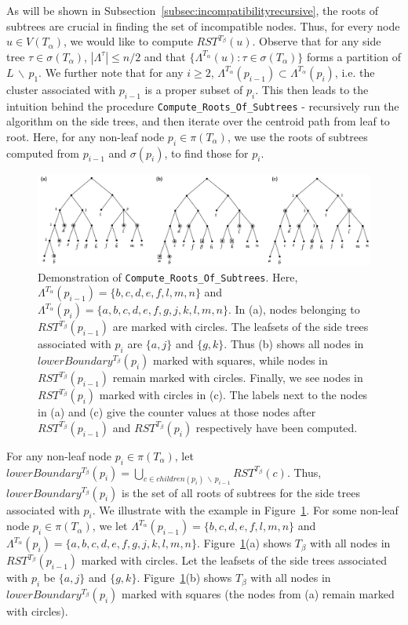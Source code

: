 \documentclass{article}
\newcommand{\leafset}{\Lambda}
\newcommand{\TA}{T_\alpha}
\newcommand{\TB}{T_\beta}
\begin{document}
    As will be shown in Subsection~\ref{subsec:incompatibilityrecursive}, the roots of subtrees are crucial in finding the set of incompatible nodes. Thus, for every node $u \in V(\TA)$, we would like to compute $RST^{\TB}(u)$. Observe that for any side tree $\tau \in \sigma(\TA)$, $|\leafset^\tau| \leq n/2$ and that $\{\leafset^{\TA}(u) : \tau \in \sigma(\TA)\}$ forms a partition of $L\, \backslash\, {p_1}$. We further note that for any $i \geq 2$, $\leafset^{\TA}(p_{i - 1}) \subset \leafset^{\TA}(p_i)$, i.e. the cluster associated with $p_{i-1}$ is a proper subset of $p_i$. This then leads to the intuition behind the procedure \texttt{Compute\_Roots\_Of\_Subtrees} - recursively run the algorithm on the side trees, and then iterate over the centroid path from leaf to root. Here, for any non-leaf node $p_i \in \pi(\TA)$, we use the roots of subtrees computed from $p_{i-1}$ and $\sigma(p_i)$, to find those for $p_i$.

    \begin{figure}[h]
        \includegraphics[scale=0.4]{rootsofsubtreesrecursive}
        \centering
        \caption{Demonstration of \texttt{Compute\_Roots\_Of\_Subtrees}. Here, $\leafset^{\TA}(p_{i-1}) = \{b, c, d, e, f, l, m, n\}$ and $\leafset^{\TA}(p_i) = \{a, b, c, d, e, f, g, j, k, l, m, n\}$. In (a), nodes belonging to $RST^{\TB}(p_{i-1})$ are marked with circles. The leafsets of the side trees associated with $p_i$ are $\{a, j\}$ and $\{g, k\}$. Thus (b) shows all nodes in $lowerBoundary^{\TB}(p_i)$ marked with squares, while nodes in $RST^{\TB}(p_{i-1})$ remain marked with circles. Finally, we see nodes in $RST^{\TB}(p_i)$ marked with circles in (c). The labels next to the nodes in (a) and (c) give the counter values at those nodes after $RST^{\TB}(p_{i-1})$ and $RST^{\TB}(p_i)$ respectively have been computed.}
        \label{fig:rootsofsubtreesrecursive}
    \end{figure}

    For any non-leaf node $p_i \in \pi(\TA)$, let $lowerBoundary^{\TB}(p_i) = \bigcup_{c \in children(p_i)\, \backslash\, p_{i-1}} RST^{\TB}(c)$. Thus,\\ %
    $lowerBoundary^{\TB}(p_i)$ is the set of all roots of subtrees for the side trees associated with $p_i$. We illustrate with the example in Figure~\ref{fig:rootsofsubtreesrecursive}. For some non-leaf node $p_i \in \pi(\TA)$, we let $\leafset^{\TA}(p_{i-1}) = \{b, c, d, e, f, l, m, n\}$ and $\leafset^{\TA}(p_i) = \{a, b, c, d, e, f, g, j, k, l, m, n\}$. Figure~\ref{fig:rootsofsubtreesrecursive}(a) shows $\TB$ with all nodes in $RST^{\TB}(p_{i-1})$ marked with circles. Let the leafsets of the side trees associated with $p_i$ be $\{a, j\}$ and $\{g, k\}$. Figure~\ref{fig:rootsofsubtreesrecursive}(b) shows $\TB$ with all nodes in $lowerBoundary^{\TB}(p_i)$ marked with squares (the nodes from (a) remain marked with circles).
\end{document}
